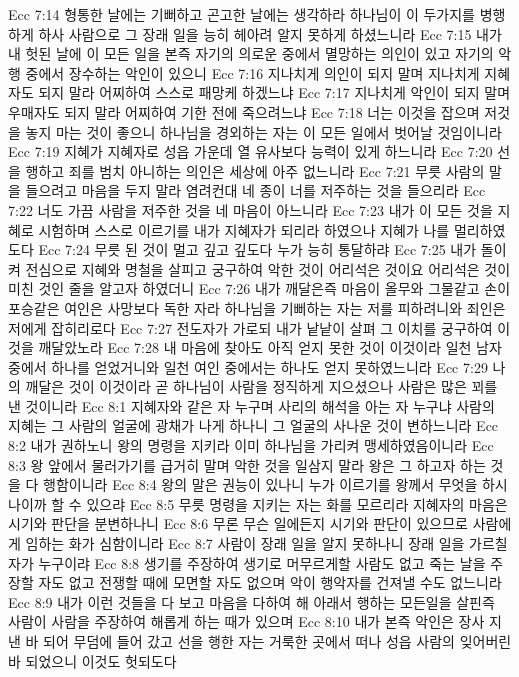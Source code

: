 Ecc 7:14  형통한 날에는 기뻐하고 곤고한 날에는 생각하라 하나님이 이 두가지를 병행하게 하사 사람으로 그 장래 일을 능히 헤아려 알지 못하게 하셨느니라
Ecc 7:15  내가 내 헛된 날에 이 모든 일을 본즉 자기의 의로운 중에서 멸망하는 의인이 있고 자기의 악행 중에서 장수하는 악인이 있으니
Ecc 7:16  지나치게 의인이 되지 말며 지나치게 지혜자도 되지 말라 어찌하여 스스로 패망케 하겠느냐
Ecc 7:17  지나치게 악인이 되지 말며 우매자도 되지 말라 어찌하여 기한 전에 죽으려느냐
Ecc 7:18  너는 이것을 잡으며 저것을 놓지 마는 것이 좋으니 하나님을 경외하는 자는 이 모든 일에서 벗어날 것임이니라
Ecc 7:19  지혜가 지혜자로 성읍 가운데 열 유사보다 능력이 있게 하느니라
Ecc 7:20  선을 행하고 죄를 범치 아니하는 의인은 세상에 아주 없느니라
Ecc 7:21  무릇 사람의 말을 들으려고 마음을 두지 말라 염려컨대 네 종이 너를 저주하는 것을 들으리라
Ecc 7:22  너도 가끔 사람을 저주한 것을 네 마음이 아느니라
Ecc 7:23  내가 이 모든 것을 지혜로 시험하며 스스로 이르기를 내가 지혜자가 되리라 하였으나 지혜가 나를 멀리하였도다
Ecc 7:24  무릇 된 것이 멀고 깊고 깊도다 누가 능히 통달하랴
Ecc 7:25  내가 돌이켜 전심으로 지혜와 명철을 살피고 궁구하여 악한 것이 어리석은 것이요 어리석은 것이 미친 것인 줄을 알고자 하였더니
Ecc 7:26  내가 깨달은즉 마음이 올무와 그물같고 손이 포승같은 여인은 사망보다 독한 자라 하나님을 기뻐하는 자는 저를 피하려니와 죄인은 저에게 잡히리로다
Ecc 7:27  전도자가 가로되 내가 낱낱이 살펴 그 이치를 궁구하여 이것을 깨달았노라
Ecc 7:28  내 마음에 찾아도 아직 얻지 못한 것이 이것이라 일천 남자 중에서 하나를 얻었거니와 일천 여인 중에서는 하나도 얻지 못하였느니라
Ecc 7:29  나의 깨달은 것이 이것이라 곧 하나님이 사람을 정직하게 지으셨으나 사람은 많은 꾀를 낸 것이니라
Ecc 8:1  지혜자와 같은 자 누구며 사리의 해석을 아는 자 누구냐 사람의 지혜는 그 사람의 얼굴에 광채가 나게 하나니 그 얼굴의 사나운 것이 변하느니라
Ecc 8:2  내가 권하노니 왕의 명령을 지키라 이미 하나님을 가리켜 맹세하였음이니라
Ecc 8:3  왕 앞에서 물러가기를 급거히 말며 악한 것을 일삼지 말라 왕은 그 하고자 하는 것을 다 행함이니라
Ecc 8:4  왕의 말은 권능이 있나니 누가 이르기를 왕께서 무엇을 하시나이까 할 수 있으랴
Ecc 8:5  무릇 명령을 지키는 자는 화를 모르리라 지혜자의 마음은 시기와 판단을 분변하나니
Ecc 8:6  무론 무슨 일에든지 시기와 판단이 있으므로 사람에게 임하는 화가 심함이니라
Ecc 8:7  사람이 장래 일을 알지 못하나니 장래 일을 가르칠 자가 누구이랴
Ecc 8:8  생기를 주장하여 생기로 머무르게할 사람도 없고 죽는 날을 주장할 자도 없고 전쟁할 때에 모면할 자도 없으며 악이 행악자를 건져낼 수도 없느니라
Ecc 8:9  내가 이런 것들을 다 보고 마음을 다하여 해 아래서 행하는 모든일을 살핀즉 사람이 사람을 주장하여 해롭게 하는 때가 있으며
Ecc 8:10  내가 본즉 악인은 장사 지낸 바 되어 무덤에 들어 갔고 선을 행한 자는 거룩한 곳에서 떠나 성읍 사람의 잊어버린 바 되었으니 이것도 헛되도다
